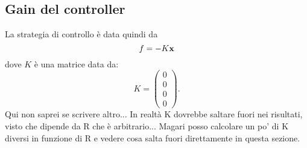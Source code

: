 \subsection{Gain del controller}
La strategia di controllo è data quindi da
\begin{equation*}
    f = -K\mathbf{x}
\end{equation*}
dove $K$ è una matrice data da:
\begin{equation*}
    K = \left(
    \begin{array}{c}
        0 \\
        0 \\
        0 \\
        0
    \end{array}
    \right).
\end{equation*}
Qui non saprei se scrivere altro... In realtà K dovrebbe saltare fuori nei risultati, visto che dipende da R che è arbitrario... Magari posso calcolare un po' di K diversi in funzione di R e vedere cosa salta fuori direttamente in questa sezione.